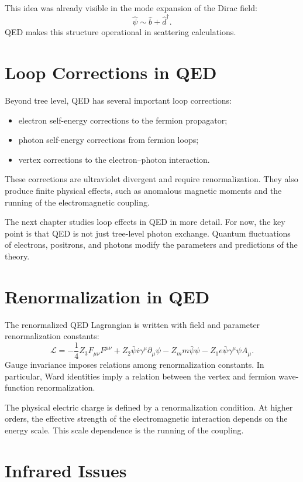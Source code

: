 This idea was already visible in the mode expansion of the Dirac field:
\[
    \hat\psi\sim \hat b+\hat d^\dagger.
\]
QED makes this structure operational in scattering calculations.

\section{Loop Corrections in QED}

Beyond tree level, QED has several important loop corrections:
\begin{itemize}
    \item electron self-energy corrections to the fermion propagator;
    \item photon self-energy corrections from fermion loops;
    \item vertex corrections to the electron--photon interaction.
\end{itemize}
These corrections are ultraviolet divergent and require renormalization. They
also produce finite physical effects, such as anomalous magnetic moments and the
running of the electromagnetic coupling.

The next chapter studies loop effects in QED in more detail. For now, the key
point is that QED is not just tree-level photon exchange. Quantum fluctuations of
electrons, positrons, and photons modify the parameters and predictions of the
theory.

\section{Renormalization in QED}

The renormalized QED Lagrangian is written with field and parameter
renormalization constants:
\[
    \mathcal{L}
    = -\frac{1}{4}Z_3 F_{\mu\nu}F^{\mu\nu}
      +Z_2\bar\psi i\gamma^\mu\partial_\mu\psi
      -Z_m m\bar\psi\psi
      -Z_1 e\bar\psi\gamma^\mu\psi A_\mu.
\]
Gauge invariance imposes relations among renormalization constants. In
particular, Ward identities imply a relation between the vertex and fermion
wave-function renormalization.

The physical electric charge is defined by a renormalization condition. At
higher orders, the effective strength of the electromagnetic interaction depends
on the energy scale. This scale dependence is the running of the coupling.

\section{Infrared Issues}

